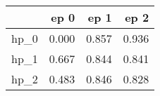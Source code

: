 \begin{tabular}{lrrr}
\toprule
{} &   ep 0 &   ep 1 &   ep 2 \\
\midrule
hp\_0 &  0.000 &  0.857 &  0.936 \\
hp\_1 &  0.667 &  0.844 &  0.841 \\
hp\_2 &  0.483 &  0.846 &  0.828 \\
\bottomrule
\end{tabular}
